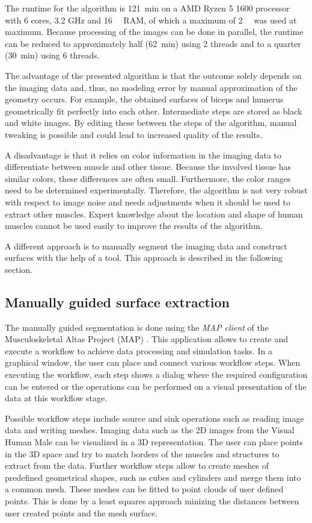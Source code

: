 The runtime for the algorithm is \SI{121}{\minute} on a AMD Ryzen 5 1600 processor with 6 cores, 3.2 GHz and \SI{16}{\giga\byte} RAM, of which a maximum of \SI{2}{\giga\byte} was used at maximum. Because processing of the images can be done in parallel, the runtime can be reduced to approximately half (\SI{62}{\minute}) using 2 threads and to a quarter (\SI{30}{\minute}) using 6 threads.

The advantage of the presented algorithm is that the outcome solely depends on the imaging data and, thus, no modeling error by manual approximation of the geometry occurs. For example, the obtained surfaces of biceps and humerus geometrically fit perfectly into each other. Intermediate steps are stored as black and white images. By editing these between the steps of the algorithm, manual tweaking is possible and could lead to increased quality of the results.

A disadvantage is that it relies on color information in the imaging data to differentiate between muscle and other tissue. Because the involved tissue has similar colors, these differences are often small. Furthermore, the color ranges need to be determined experimentally. Therefore, the algorithm is not very robust with respect to image noise and needs adjustments when it should be used to extract other muscles. Expert knowledge about the location and shape of human muscles cannot be used easily to improve the results of the algorithm.

A different approach is to manually segment the imaging data and construct surfaces with the help of a tool. This approach is described in the following section.

\subsection{Manually guided surface extraction}\label{sec:surf_extr}

The manually guided segmentation is done using the \emph{MAP client} of the Musculoskeletal Altas Project (MAP) \cite{mapclient}. This application allows to create and execute a workflow to achieve data processing and simulation tasks. In a graphical window, the user can place and connect various workflow steps. When executing the workflow, each step shows a dialog where the required configuration can be entered or the operations can be performed on a visual presentation of the data at this workflow stage. 

Possible workflow steps include source and sink operations such as reading image data and writing meshes. Imaging data such as the 2D images from the Visual Human Male can be visualized in a 3D representation. The user can place points in the 3D space and try to match borders of the muscles and structures to extract from the data.
Further workflow steps allow to create meshes of predefined geometrical shapes, such as cubes and cylinders and merge them into a common mesh. These meshes can be fitted to point clouds of user defined points. This is done by a least squares approach minizing the distances between user created points and the mesh surface.

